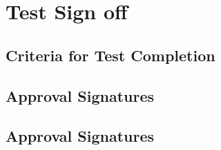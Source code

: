 \chapter{Test Sign off}

\section{ Criteria for Test Completion}
\section{Approval Signatures}
\section{Approval Signatures}
